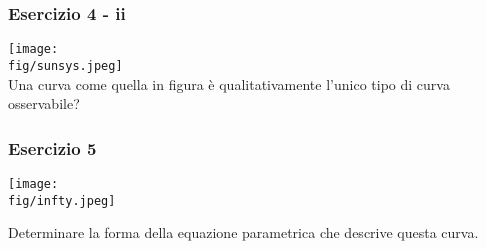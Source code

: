 \documentclass{beamer}
\newcommand{\fig}{figures} %
\begin{document}
\begin{frame}
\frametitle{Esercizio 4 - ii}

\texttt{[image: \\fig/sunsys.jpeg]}
\\
Una curva come quella in figura \`e  qualitativamente l'unico tipo di curva osservabile?
\end{frame}


\begin{frame}
\frametitle{Esercizio 5}

\texttt{[image: \\fig/infty.jpeg]}

Determinare la forma della equazione parametrica che descrive questa curva. 
\end{frame}
\end{document}
